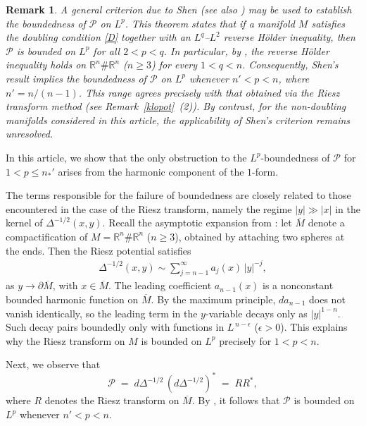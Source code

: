 \documentclass[12pt]{amsart}
\newtheorem{remark}[theorem]{Remark}
\begin{document}
\begin{remark}
A general criterion due to Shen \cite[Theorem~3.1]{shen} (see also \cite[Theorem~2.3]{AC}) may be used to establish the boundedness of $\mathcal{P}$ on $L^p$. This theorem states that if a manifold $M$ satisfies the doubling condition \eqref{D} together with an $L^q$–$L^2$ reverse Hölder inequality, then $\mathcal{P}$ is bounded on $L^p$ for all $2<p<q$. In particular, by \cite[Example~4]{CJKS}, the reverse Hölder inequality holds on $\mathbb{R}^n \# \mathbb{R}^n$ ($n \geq 3$) for every $1<q<n$. Consequently, Shen’s result implies the boundedness of $\mathcal{P}$ on $L^p$ whenever $n' < p < n$, where $n' = n/(n-1)$. This range agrees precisely with that obtained via the Riesz transform method (see Remark~\ref{klopot}~(2)). By contrast, for the non-doubling manifolds considered in this article, the applicability of Shen’s criterion remains unresolved.
\end{remark}




In this article, we show that the only obstruction to the $L^p$-boundedness of $\mathcal{P}$ for $1<p \leq n_*'$ arises from the harmonic component of the $1$-form. 

The terms responsible for the failure of boundedness are closely related to those encountered in the case of the Riesz transform, namely the regime $\lvert y \rvert \gg \lvert x \rvert$ in the kernel of $\Delta^{-1/2}(x,y)$. Recall the asymptotic expansion from \cite{CCH}: let $\overline M$ denote a compactification of $M = \mathbb{R}^n \# \mathbb{R}^n$ ($n \geq 3$), obtained by attaching two spheres at the ends. Then the Riesz potential satisfies
\begin{align}\label{asy}
    \Delta^{-1/2}(x,y) \sim \sum_{j = n-1}^\infty a_j(x)\,|y|^{-j},
\end{align}
as $y \to \partial \overline M$, with $x \in \overline M$. The leading coefficient $a_{n-1}(x)$ is a nonconstant bounded harmonic function on $\overline M$. By the maximum principle, $d a_{n-1}$ does not vanish identically, so the leading term in the $y$-variable decays only as $\lvert y\rvert^{1-n}$. Such decay pairs boundedly only with functions in $L^{\,n-\epsilon}$ ($\epsilon>0$). This explains why the Riesz transform on $M$ is bounded on $L^p$ precisely for $1<p<n$.



Next, we observe that
\[
\mathcal{P} \;=\; d\Delta^{-1/2}\,(d\Delta^{-1/2})^* \;=\; R R^*,
\]
where $R$ denotes the Riesz transform on $\overline M$. By \cite{CCH}, it follows that $\mathcal{P}$ is bounded on $L^p$ whenever $n'<p<n$.  
\end{document}
